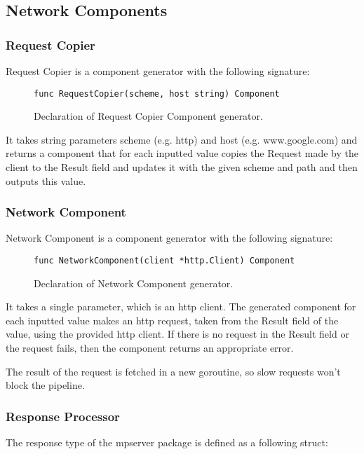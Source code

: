 \documentclass[12pt,a4paper]{article}
\begin{document}
\subsection{Network Components}
\subsubsection{Request Copier}
Request Copier is a component generator with the following signature:

\begin{figure}[h]
\centering
\begin{lstlisting}
func RequestCopier(scheme, host string) Component
\end{lstlisting}
\caption[scale=1.0]{Declaration of Request Copier Component generator.}
\label{fig:RequestCopier}
\end{figure}

It takes string parameters scheme (e.g. http) and host (e.g. www.google.com) 
and returns a component that for each inputted value copies the Request made 
by the client to the Result field and updates it with the given scheme and 
path and then outputs this value.

\subsubsection{Network Component}
Network Component is a component generator with the following signature:

\begin{figure}[h]
\centering
\begin{lstlisting}
func NetworkComponent(client *http.Client) Component
\end{lstlisting}
\caption[scale=1.0]{Declaration of Network Component generator.}
\label{fig:NetworkComponent}
\end{figure}

It takes a single parameter, which is an http client.
The generated component for each inputted value makes an http request,
taken from the Result field of the value, using the provided http client.
If there is no request in the Result field or the request fails, then
the component returns an appropriate error. 

The result of the request is fetched in a new goroutine, so slow requests
won't block the pipeline.

\subsubsection{Response Processor}
The response type of the mpserver package is defined as a following struct:
\end{document}
